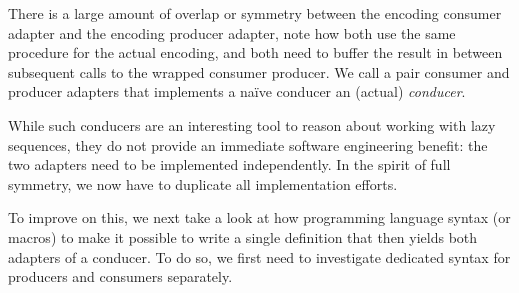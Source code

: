 \documentclass[sigplan,screen,10pt,review]{acmart}
\begin{document}
There is a large amount of overlap or symmetry between the encoding consumer adapter and the encoding producer adapter, note how both use the same procedure for the actual encoding, and both need to buffer the result in between subsequent calls to the wrapped consumer producer. We call a pair consumer and producer adapters that implements a naïve conducer an (actual) \textit{conducer}.

While such conducers are an interesting tool to reason about working with lazy sequences, they do not provide an immediate software engineering benefit: the two adapters need to be implemented independently. In the spirit of full symmetry, we now have to duplicate all implementation efforts.

To improve on this, we next take a look at how programming language syntax (or macros) to make it possible to write a single definition that then yields both adapters of a conducer. To do so, we first need to investigate dedicated syntax for producers and consumers separately.




\end{document}
